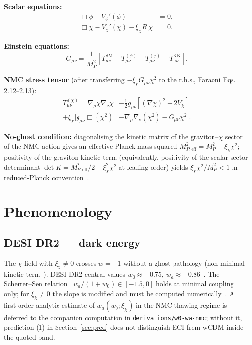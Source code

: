\documentclass[epjc3,twocolumn]{svjour3}
\begin{document}
\textbf{Scalar equations:}
\begin{align}
\Box \phi - V_\phi'(\phi) &= 0,\\
\Box \chi - V_\chi'(\chi) - \xi_\chi R\, \chi &= 0.
\end{align}

\textbf{Einstein equations:}
\begin{equation}
G_{\mu\nu} = \frac{1}{M_P^2} \left[ T_{\mu\nu}^{\mathrm{SM}} + T_{\mu\nu}^{(\phi)} + T_{\mu\nu}^{(\chi)} + T_{\mu\nu}^{\mathrm{KK}} \right].
\end{equation}

\textbf{NMC stress tensor} (after transferring $-\xi_\chi G_{\mu\nu} \chi^2$ to the r.h.s., Faraoni Eqs. 2.12--2.13):
\begin{align}
T_{\mu\nu}^{(\chi)} = \nabla_\mu \chi \nabla_\nu \chi & - \tfrac{1}{2} g_{\mu\nu}\left[(\nabla \chi)^2 + 2 V_\chi\right] \nonumber \\
+ \xi_\chi \Big[ g_{\mu\nu} \Box(\chi^2) & - \nabla_\mu \nabla_\nu(\chi^2) - G_{\mu\nu} \chi^2 \Big].
\end{align}

\textbf{No-ghost condition:} diagonalising the kinetic matrix of the graviton--$\chi$ sector of the NMC action gives an effective Planck mass squared $M_{P,\mathrm{eff}}^2 = M_P^2 - \xi_\chi \chi^2$; positivity of the graviton kinetic term (equivalently, positivity of the scalar-sector determinant $\det K = M_{P,\mathrm{eff}}^2/2 - \xi_\chi^2 \chi^2$ at leading order) yields
$\xi_\chi \chi^2 / M_P^2 < 1$ in reduced-Planck convention~\cite{Faraoni2004}.

\section{Phenomenology}\label{sec:pheno}

\subsection{DESI DR2 --- dark energy}
The $\chi$ field with $\xi_\chi \neq 0$ crosses $w = -1$ without a ghost pathology (non-minimal kinetic term~\cite{BarceloVisser2000}). DESI DR2 central values $w_0 \approx -0.75$, $w_a \approx -0.86$~\cite{DESIDR2}. The Scherrer--Sen relation~\cite{ScherrerSen2008} $w_a / (1+w_0) \in [-1.5, 0]$ holds at minimal coupling only; for $\xi_\chi \neq 0$ the slope is modified and must be computed numerically~\cite{Sanchez2025}. A first-order analytic estimate of $w_a(w_0; \xi_\chi)$ in the NMC thawing regime is deferred to the companion computation in \texttt{derivations/w0-wa-nmc}; without it, prediction (1) in Section~\ref{sec:pred} does not distinguish ECI from wCDM inside the quoted band.
\end{document}
